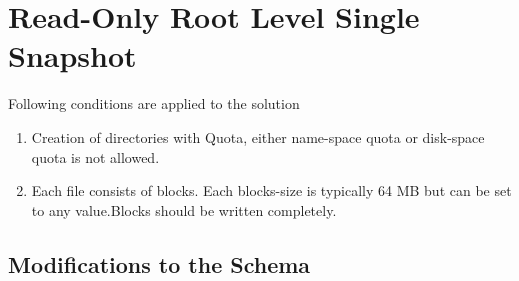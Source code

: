 
%
%
%


\chapter{Read-Only Root Level Single Snapshot}
\label{ch:RORLSSSolution}

Following conditions are applied to the solution
\begin{enumerate}
\item Creation of directories with Quota, either name-space quota or disk-space quota is not allowed.
\item Each file consists of blocks. Each blocks-size is typically 64 MB but can be set to any value.Blocks should be written completely.
\end{enumerate}



\section{Modifications to the Schema}


